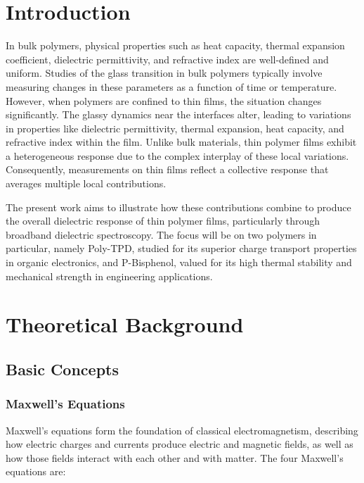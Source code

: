 \chapter{Introduction}

In bulk polymers, physical properties such as heat capacity, thermal expansion coefficient, dielectric permittivity, and refractive index are well-defined and uniform. Studies of the glass transition in bulk polymers typically involve measuring changes in these parameters as a function of time or temperature. However, when polymers are confined to thin films, the situation changes significantly. The glassy dynamics near the interfaces alter, leading to variations in properties like dielectric permittivity, thermal expansion, heat capacity, and refractive index within the film. Unlike bulk materials, thin polymer films exhibit a heterogeneous response due to the complex interplay of these local variations. Consequently, measurements on thin films reflect a collective response that averages multiple local contributions.

The present work aims to illustrate how these contributions combine to produce the overall dielectric response of thin polymer films, particularly through broadband dielectric spectroscopy. The focus will be on two polymers in particular, namely Poly-TPD, studied for its superior charge transport properties in organic electronics, and P-Bisphenol, valued for its high thermal stability and mechanical strength in engineering applications.
\chapter{Theoretical Background}
\section{Basic Concepts}
\subsection{Maxwell's Equations}

Maxwell's equations form the foundation of classical electromagnetism, describing how electric charges and currents produce electric and magnetic fields, as well as how those fields interact with each other and with matter. The four Maxwell's equations are:

